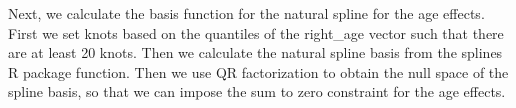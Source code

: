 \documentclass[11pt,]{article}
\newenvironment{Shaded}{\begin{snugshade}}{\end{snugshade}}
\newcommand{\KeywordTok}[1]{\textcolor[rgb]{0.13,0.29,0.53}{\textbf{#1}}}
\newcommand{\DataTypeTok}[1]{\textcolor[rgb]{0.13,0.29,0.53}{#1}}
\newcommand{\DecValTok}[1]{\textcolor[rgb]{0.00,0.00,0.81}{#1}}
\newcommand{\StringTok}[1]{\textcolor[rgb]{0.31,0.60,0.02}{#1}}
\newcommand{\OtherTok}[1]{\textcolor[rgb]{0.56,0.35,0.01}{#1}}
\newcommand{\OperatorTok}[1]{\textcolor[rgb]{0.81,0.36,0.00}{\textbf{#1}}}
\newcommand{\NormalTok}[1]{#1}
\begin{document}
\begin{Shaded}
\end{Shaded}

Next, we calculate the basis function for the natural spline for the age
effects. First we set knots based on the quantiles of the right\_age
vector such that there are at least 20 knots. Then we calculate the
natural spline basis from the splines R package function. Then we use QR
factorization to obtain the null space of the spline basis, so that we
can impose the sum to zero constraint for the age effects.
\end{document}
